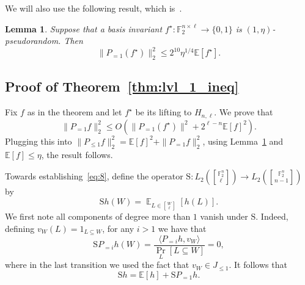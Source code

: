 \documentclass[11pt]{article}
\newtheorem{lemma}[thm]{Lemma}
\newcommand\E{\mathbb{E}}
\newcommand\Prob[2]{{\Pr_{#1}\left[ {#2} \right]}}
\newcommand\norm[1]{\| #1 \|}
\newcommand\Expect[2]{{\mathop{\mathbb{E}}_{#1}\left[ {#2} \right]}}
\newcommand\inner[2]{\langle{#1},{#2}\rangle}
\renewcommand\leq{\leqslant}
\providecommand{\sqbinom}[2]{\genfrac{[}{]}{0pt}{}{#1}{#2}}
\begin{document}
We will also use the following result, which is~\cite[Theorem 2.13]{KMS2}.
\begin{lemma}\label{lem:lvl_1_bilinear}
    Suppose that a basis invariant $f^{\star}\colon \mathbb{F}_2^{n\times \ell}\to\{0,1\}$ is $(1,\eta)$-pseudorandom. Then
    \[
    \norm{P_{=1}(f^{\star})}_{2}^2\leq 2^{10}\eta^{1/4} \E[f^{\star}].
    \]
\end{lemma}

\subsection{Proof of 
Theorem~\ref{thm:lvl_1_ineq}}\label{sec:apx_1}
   Fix $f$ as in the theorem and let $f^{\star}$ be its lifting to $H_{n,\ell}$. We prove that
   \begin{equation}\label{eq:8}
   \norm{P_{=1}f}_2^2
   \leq
   O(\norm{P_{=1}(f^{\star})}^2+2^{\ell-n}\E[f]^2).
   \end{equation}
   Plugging this into $\norm{P_{\leq 1}f}_2^2=\E[f]^2+\norm{P_{=1}f}_2^2$, using Lemma~\ref{lem:lvl_1_bilinear} and $\E[f]\leq \eta$, the result follows. 
   
   Towards establishing~\eqref{eq:8}, define the operator $\mathrm{S}\colon L_2({\sqbinom{\mathbb{F}_2^n}{\ell}})
   \to 
   L_2(\sqbinom{\mathbb{F}_2^n}{n-1})$ by
   \[
   \mathrm{S} h(W) =
   \Expect{L\in {\sqbinom{W}{\ell}}}{h(L)}.
   \]
   We first note all components of degree more than $1$ vanish under $\mathrm{S}$. Indeed, defining $v_W(L) = 1_{L\subseteq W}$, for any $i>1$ we have that 
   \[
   \mathrm{S} P_{=i} h(W)
   =
   \frac{\inner{P_{=i} h}{v_W}}{\Prob{L}{L\subseteq W}}
   =0,
   \]
   where in the last transition we used the fact that $v_W\in J_{\leq 1}$. It follows that 
   \begin{equation}\label{eq:6}
   \mathrm{S} h = \E[h] + \mathrm{S} P_{=1}h.
   \end{equation}
   
\end{document}
